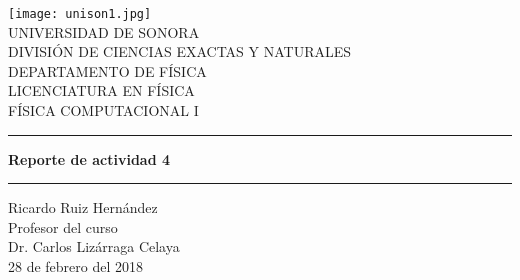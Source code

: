\documentclass{article}
\begin{document}
\begin{center}
\texttt{[image: unison1.jpg]}
\\
\vspace{0.5cm}
UNIVERSIDAD DE SONORA \\
\vspace{0.5cm}
DIVISIÓN DE CIENCIAS EXACTAS Y NATURALES \\
\vspace{0.5cm}
DEPARTAMENTO DE FÍSICA\\
\vspace{0.5cm}
LICENCIATURA EN FÍSICA\\
\vspace{0.5cm}
FÍSICA COMPUTACIONAL I
\vspace{2 cm}
\hrule
\vspace{1 cm}

{\huge \bfseries {Reporte de actividad 4}}
\\
\vspace{1 cm}
\hrule
\vspace{2 cm}
Ricardo Ruiz Hernández\\ 
\vspace{1 cm}
Profesor del curso\\
Dr. Carlos Lizárraga Celaya\\
\vspace{2 cm}
28 de febrero del 2018
\end{center}
\end{document}
